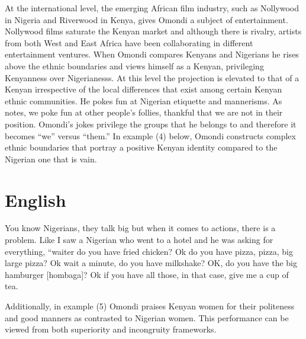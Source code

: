 \documentclass[output=paper]{langsci/langscibook}
\begin{document}
  At the international level, the emerging African film industry, such as Nollywood in Nigeria and Riverwood in Kenya, gives Omondi a subject of entertainment. Nollywood films saturate the Kenyan market and although there is rivalry, artists from both West and East Africa have been collaborating in different entertainment ventures. When Omondi compares Kenyans and Nigerians he rises above the ethnic boundaries and views himself as a Kenyan, privileging Kenyanness over Nigerianesss. At this level the projection is elevated to that of a Kenyan irrespective of the local differences that exist among certain Kenyan ethnic communities. He pokes fun at Nigerian etiquette and mannerisms. As \citet{Labraddor2004} notes, we poke fun at other people’s follies, thankful that we are not in their position. Omondi’s jokes privilege the groups that he belongs to and therefore it becomes “we” versus “them.” In example (4) below, Omondi constructs complex ethnic boundaries that portray a positive Kenyan identity compared to the Nigerian one that is vain.

\chapter[English ]{English }
\gll You know Nigerians, they talk big but when it comes to actions, there is a problem. Like I saw a Nigerian who went to a hotel and he was asking for everything, “waiter do you have fried chicken? Ok do you have pizza, pizza, big large pizza? Ok wait a minute, do you have milkshake? OK, do you have the big hamburger \textup{[hombaga]}? Ok if you have all those, in that case, give me a cup of tea. \\
\glt \citep{Omogi2012a}
\z

Additionally, in example (5) Omondi praises Kenyan women for their politeness and good manners as contrasted to Nigerian women. This performance can be viewed from both superiority and incongruity frameworks.
\end{document}
